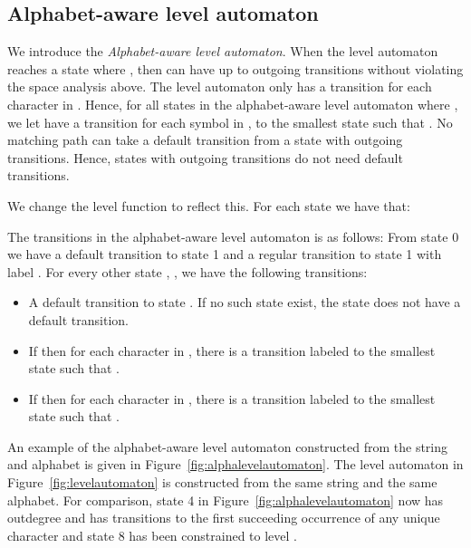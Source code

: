 \documentclass[a4paper,11pt]{article}
\begin{document}
\subsection{Alphabet-aware level automaton}
We introduce the \emph{Alphabet-aware level automaton}. When the level automaton reaches a state  where , then  can have up to  outgoing transitions without violating the space analysis above. The level automaton only has a transition for each character in . Hence, for all states  in the alphabet-aware level automaton where , we let  have a transition for each symbol  in , to the smallest state  such that . No matching path can take a default transition from a state with  outgoing transitions. Hence, states with  outgoing transitions do not need default transitions.

We change the level function to reflect this. For each state  we have that:



The transitions in the alphabet-aware level automaton is as follows:
From state 0 we have a default transition to state 1 and a regular transition to state 1 with label .
For every other state , , we have the following transitions:
\begin{itemize}
\item A default transition to state . If no such state exist, the state  does not have a default transition.
\item If  then for each character  in , there is a transition labeled  to the smallest state  such that .
\item If  then for each character  in , there is a transition labeled  to the smallest state  such that .
\end{itemize}

An example of the alphabet-aware level automaton constructed from the string  and alphabet  is given in Figure~\ref{fig:alphalevelautomaton}. The level automaton in Figure~\ref{fig:levelautomaton} is constructed from the same string and the same alphabet. For comparison, state 4 in Figure~\ref{fig:alphalevelautomaton} now has outdegree  and has transitions to the first succeeding occurrence of any unique character and state 8 has been constrained to level .
\end{document}
